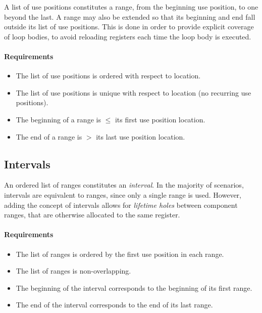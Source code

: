 \documentclass{llncs}
\begin{document}
A list of use positions constitutes a range, from the beginning use position,
to one beyond the last.  A range may also be extended so that its beginning
and end fall outside its list of use positions.  This is done in order to
provide explicit coverage of loop bodies, to avoid reloading registers each
time the loop body is executed.

\paragraph{Requirements}

\begin{itemize}
\item The list of use positions is ordered with respect to location.
\item The list of use positions is unique with respect to location (no
  recurring use positions).
\item The beginning of a range is $\le$ its first use position location.
\item The end of a range is $>$ its last use position location.
\end{itemize}

\subsection{Intervals}
\label{sec:intervals}

An ordered list of ranges constitutes an \emph{interval}.  In the majority of
scenarios, intervals are equivalent to ranges, since only a single range is
used.  However, adding the concept of intervals allows for \emph{lifetime
  holes} between component ranges, that are otherwise allocated to the same
register.

\paragraph{Requirements}

\begin{itemize}
\item The list of ranges is ordered by the first use position in each range.
\item The list of ranges is non-overlapping.
\item The beginning of the interval corresponds to the beginning of its first
  range.
\item The end of the interval corresponds to the end of its last range.
\end{itemize}
\end{document}
